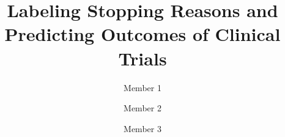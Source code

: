 \documentclass[10pt,twocolumn,letterpaper]{article}
\title{Labeling Stopping Reasons and Predicting Outcomes of Clinical Trials}
\author{Member 1 \and Member 2 \and Member 3}
\begin{document}


\maketitle





{
    \small
    
    
}
\end{document}

